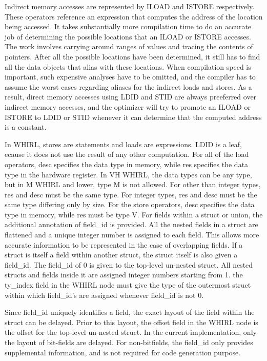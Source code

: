 \documentclass{article}
\begin{document}
Indirect memory accesses are represented by ILOAD and ISTORE
respectively. These operators reference an expression that computes
the address of the location being accessed. It takes substantially
more compilation time to do an accurate job of determining the
possible locations that an ILOAD or ISTORE accesses. The work
involves carrying around ranges of values and tracing the contents
of pointers. After all the possible locations have been determined,
it still has to find all the data objects that alias with these
locations. When compilation speed is important, such expensive
analyses have to be omitted, and the compiler has to assume the worst
cases regarding aliases for the indirect loads and stores. As a
result, direct memory accesses using LDID and STID are always
preeferred over indirect memory accesses, and the optimizer 
will try to promote an ILOAD or ISTORE to LDID or STID whenever it can
determine that the computed address is a constant.

In WHIRL, stores are statements and loads are expressions. LDID is a
leaf, ecause it does not use the result of any other computation. For
all of the load operators, desc specifies the data type in memory,
while res specifies the data type in the hardware register. In VH
WHIRL, the data types can be any type, but in M WHIRL and lower,
type M is not allowed. For other than integer types, res and desc
must be the same type. For integer types, res and desc must be the
same type differing only by size. For the store operators, desc
specifies the data type in memory, while res must be type V. For
fields within a struct or union, the additional annotation of
field\_id is provided. All the nested fields in a struct are flattened
and a unique integer number is assigned to each field. This allows
more accurate information to be represented in the case of
overlapping fields. If a struct is itself a field within another
struct, the struct itself is also given a field\_id. The
field\_id of 0 is given to the top-level un-nested struct. All nested
structs and fields inside it are assigned integer numbers starting
from 1. the ty\_index field in the WHIRL node must give the type of
the outermost struct within which field\_id's are assigned whenever
field\_id is not 0.


Since field\_id uniquely identifies a field, the exact layout of
the field within the struct can be delayed. Prior to this layout,
the offset field in the WHIRL node is the offset for the top-level
un-nested struct. In the current implementation, only the layout of
bit-fields are delayed. For non-bitfields, the field\_id only provides
supplemental information, and is not required for code generation
purpose.
\end{document}
